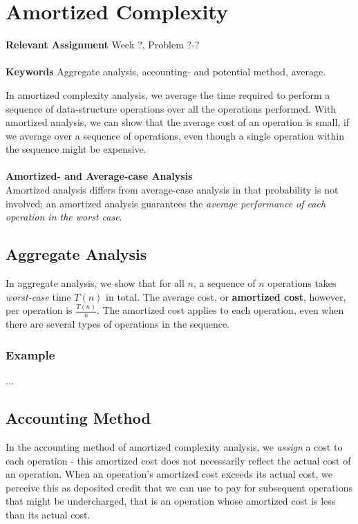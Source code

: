 
\chapter{Amortized Complexity}
\label{ch:amortizedcomplexity}

\textbf{Relevant Assignment} Week ?, Problem ?-?\\\\
\textbf{Keywords} Aggregate analysis, accounting- and potential method, average.
\vspace{1in}

\noindent In amortized complexity analysis, we average the time required to
perform a sequence of data-structure operations over all the operations
performed. With amortized analysis, we can show that the average cost of an
operation is small, if we average over a sequence of operations, even though
a single operation within the sequence might be expensive.
\\\\
\noindent \textbf{Amortized- and Average-case Analysis} \\
Amortized analysis differs from average-case analysis in that probability is
not involved; an amortized analysis guarantees the \textit{average performance
of each operation in the worst case}.

\newpage
\section{Aggregate Analysis}
In aggregate analysis, we show that for all $n$, a sequence of $n$ operations
takes \textit{worst-case} time $T(n)$ in total. The average cost, or \textbf{
amortized cost}, however, per operation is $\frac{T(n)}{n}$. The amortized
cost applies to each operation, even when there are several types of
operations in the sequence.

\subsection{Example}
...

\section{Accounting Method}
In the accounting method of amortized complexity analysis, we \textit{assign}
a cost to each operation - this amortized cost does not necessarily reflect
the actual cost of an operation. When an operation's amortized cost exceeds
its actual cost, we perceive this as deposited credit that we can use to pay
for subsequent operations that might be undercharged, that is an operation
whose amortized cost is less than its actual cost.

